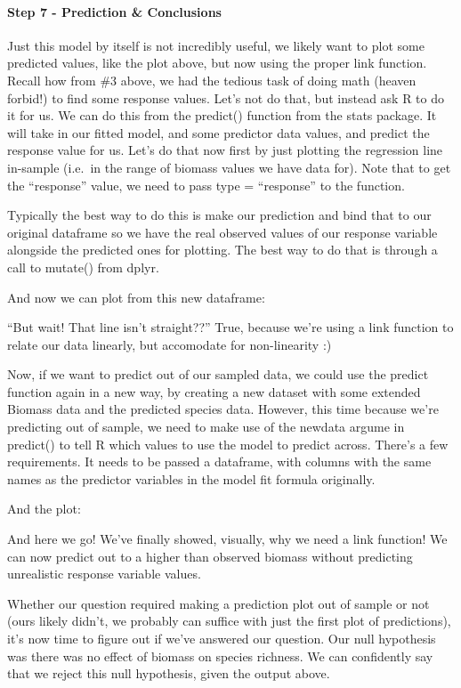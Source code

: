 \documentclass[
]{article}
\begin{document}
\hypertarget{step-7---prediction-conclusions}{%
\paragraph{Step 7 - Prediction \&
Conclusions}\label{step-7---prediction-conclusions}}

Just this model by itself is not incredibly useful, we likely want to
plot some predicted values, like the plot above, but now using the
proper link function. Recall how from \#3 above, we had the tedious task
of doing math (heaven forbid!) to find some response values. Let's not
do that, but instead ask R to do it for us. We can do this from the
predict() function from the stats package. It will take in our fitted
model, and some predictor data values, and predict the response value
for us. Let's do that now first by just plotting the regression line
in-sample (i.e.~in the range of biomass values we have data for). Note
that to get the ``response'' value, we need to pass type = ``response''
to the function.

Typically the best way to do this is make our prediction and bind that
to our original dataframe so we have the real observed values of our
response variable alongside the predicted ones for plotting. The best
way to do that is through a call to mutate() from dplyr.

And now we can plot from this new dataframe:

``But wait! That line isn't straight??'' True, because we're using a
link function to relate our data linearly, but accomodate for
non-linearity :)

Now, if we want to predict out of our sampled data, we could use the
predict function again in a new way, by creating a new dataset with some
extended Biomass data and the predicted species data. However, this time
because we're predicting out of sample, we need to make use of the
newdata argume in predict() to tell R which values to use the model to
predict across. There's a few requirements. It needs to be passed a
dataframe, with columns with the same names as the predictor variables
in the model fit formula originally.

And the plot:

And here we go! We've finally showed, visually, why we need a link
function! We can now predict out to a higher than observed biomass
without predicting unrealistic response variable values.

Whether our question required making a prediction plot out of sample or
not (ours likely didn't, we probably can suffice with just the first
plot of predictions), it's now time to figure out if we've answered our
question. Our null hypothesis was there was no effect of biomass on
species richness. We can confidently say that we reject this null
hypothesis, given the output above.
\end{document}
